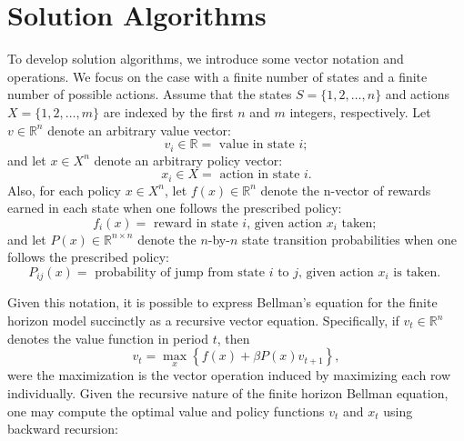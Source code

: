 \documentclass[\topdir/lecture\_notes.tex]{subfiles}
\begin{document}
\section{Solution Algorithms}
To develop solution algorithms, we introduce some vector notation and operations. We focus on the case with a finite number of states and a finite number of possible actions. Assume that the states $S=\{1,2, \ldots, n\}$ and actions $X=\{1,2, \ldots, m\}$ are indexed by the first $n$ and $m$ integers, respectively. Let $v \in \mathbb{R}^{n}$ denote an arbitrary value vector:
\begin{equation*}
v_{i} \in \mathbb{R}=\text { value in state } i ;
\end{equation*}
and let $x \in X^{n}$ denote an arbitrary policy vector:
\begin{equation*}
x_{i} \in X=\text { action in state } i .
\end{equation*}
Also, for each policy $x \in X^{n}$, let $f(x) \in \mathbb{R}^{n}$ denote the n-vector of rewards earned in each state when one follows the prescribed policy:
\begin{equation*}
f_{i}(x)=\text { reward in state } i \text {, given action } x_{i} \text { taken; }
\end{equation*}
and let $P(x) \in \mathbb{R}^{n \times n}$ denote the $n$-by-$n$ state transition probabilities when one follows the prescribed policy:
\begin{equation*}
P_{i j}(x)=\text { probability of jump from state } i \text { to } j \text {, given action } x_{i} \text { is taken. }
\end{equation*}

Given this notation, it is possible to express Bellman's equation for the finite horizon model succinctly as a recursive vector equation. Specifically, if $v_{t} \in \mathbb{R}^{n}$ denotes the value function in period $t$, then
\begin{equation*}
v_{t}=\max _{x}\left\{f(x)+\beta P(x) v_{t+1}\right\},
\end{equation*}
were the maximization is the vector operation induced by maximizing each row individually. Given the recursive nature of the finite horizon Bellman equation, one may compute the optimal value and policy functions $v_{t}$ and $x_{t}$ using backward recursion:
\end{document}

